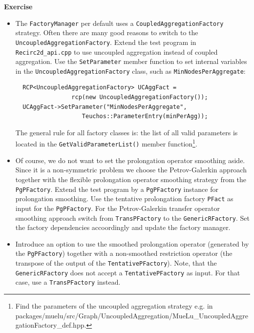 \documentclass[12pt,a4paper]{article}
\begin{document}
\begin{graybox}
 \textbf{Exercise}
 \begin{itemize}
  \item The \verb|FactoryManager| per default uses a \verb|CoupledAggregationFactory| strategy. Often there are many good reasons to switch to the \verb|UncoupledAggregationFactory|. Extend the test program in \verb|Recirc2d_api.cpp| to use uncoupled aggregation instead of coupled aggregation. Use the \verb|SetParameter| member function to set internal variables in the \verb|UncoupledAggregationFactory| class, such as \verb|MinNodesPerAggregate|:
  \begin{verbatim}
  RCP<UncoupledAggregationFactory> UCAggFact =
                rcp(new UncoupledAggregationFactory());
  UCAggFact->SetParameter("MinNodesPerAggregate",
                   Teuchos::ParameterEntry(minPerAgg));
  \end{verbatim}
  The general rule for all factory classes is: the list of all valid parameters is located in the \verb|GetValidParameterList()| member function\footnote{Find the parameters of the uncoupled aggregation strategy e.g. in packages/muelu/src/Graph/UncoupledAggregation/MueLu\_UncoupledAggregationFactory\_def.hpp.}.
  \item Of course, we do not want to set the prolongation operator smoothing aside. Since it is a non-symmetric problem we choose the Petrov-Galerkin approach together with the flexible prolongation operator smoothing strategy from the \verb|PgPFactory|. Extend the test program by a \verb|PgPFactory| instance for prolongation smoothing. Use the tentative prolongation factory \verb|PFact| as input for the \verb|PgPFactory|. For the Petrov-Galerkin transfer operator smoothing approach switch from \verb|TransPFactory| to the \verb|GenericRFactory|. Set the factory dependencies accoordingly and update the factory manager.
  \item Introduce an option to use the smoothed prolongation operator (generated by the \verb|PgPFactory|) together with a non-smoothed restriction operator (the transpose of the output of the \verb|TentativePFactory|). Note, that the \verb|GenericRFactory| does not accept a \verb|TentativePFactory| as input. For that case, use a \verb|TransPFactory| instead.
 \end{itemize}
\end{graybox}
\end{document}
